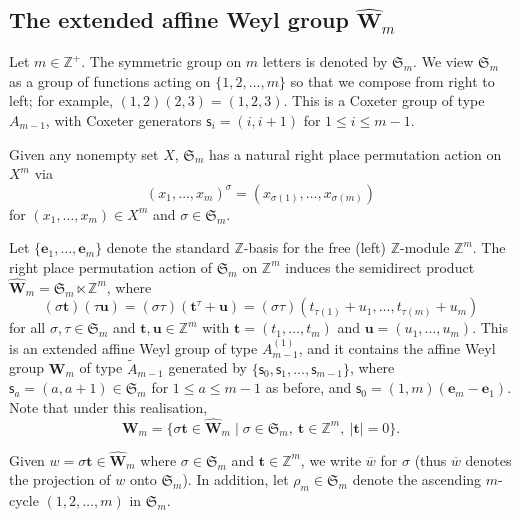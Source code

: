 \documentclass[11pt,a4paper,reqno]{amsart}
\numberwithin{equation}{section}
\theoremstyle{plain}
\theoremstyle{definition}
\theoremstyle{remark}
\numberwithin{equation}{section}
\newcommand{\bt}{\mathbf{t}}
\newcommand{\bu}{\mathbf{u}}
\newcommand{\ZZ}{\mathbb{Z}}
\newcommand{\cs}{\mathsf{s}}
\newcommand{\rr}{\rho}
\newcommand{\Be}{\mathbf{e}}
\newcommand{\EW}{\widehat{\mathbf{W}}}
\newcommand{\AW}{\mathbf{W}}
\newcommand{\sym}[1]{\mathfrak{S}_{#1}}
\def\Z{{\mathbb Z}}
\begin{document}
\subsection{The extended affine Weyl group $\EW_{m}$} \label{SS:Weyl}

Let $m \in \Z^+$.
The symmetric group on $m$ letters is denoted by $\sym{m}$.  We view $\sym{m}$ as a group of functions acting on $\{1,2,\dotsc,m\}$ so that we compose from right to left; for example, $(1,2)(2,3) = (1,2,3)$.  This is a Coxeter group of type $A_{m-1}$, with Coxeter generators $\cs_i = (i,i+1)$ for $1 \leq i \leq m-1$.

Given any nonempty set $X$, $\sym{m}$ has a natural right place permutation action on $X^{m}$ via
$$
(x_1,\dotsc, x_{m})^{\sigma} = (x_{\sigma(1)},\dotsc, x_{\sigma(m)})
$$
for $(x_1,\dotsc, x_m) \in X^m$ and $\sigma \in \sym{m}$.

Let $\{ \Be_1, \dotsc, \Be_m\}$ denote the standard $\Z$-basis for the free (left) $\Z$-module $\Z^m$.
The right place permutation action of $\sym{m}$ on $\Z^m$ induces the semidirect product $\EW_m = \sym{m} \ltimes \Z^m$,
where
\begin{equation*}
(\sigma \bt)(\tau \bu) = (\sigma\tau) (\bt^{\tau} + \bu) = (\sigma\tau) (t_{\tau(1)} + u_1, \dotsc, t_{\tau(m)}+ u_m) %
\end{equation*}
for all $\sigma,\tau \in \sym{m}$ and $\bt,\bu \in \Z^m$ with $\bt = (t_1,\dotsc, t_m)$ and $\bu = (u_1,\dotsc, u_m)$.
This is an extended affine Weyl group of type $A^{(1)}_{m-1}$, and it contains the affine Weyl group $\AW_m$ of type $\widetilde{A}_{m-1}$ generated by $\{ \cs_0,\cs_1, \dotsc, \cs_{m-1}\}$, where $\cs_a = (a,a+1) \in \sym{m}$ for $1 \leq a \leq m-1$ as before, and $\cs_0 = (1,m)(\Be_m - \Be_1)$.
Note that under this realisation,
\begin{equation}
\AW_m = \{ \sigma \bt \in \EW_m \mid \sigma \in \sym{m},\ \bt \in \ZZ^m,\ |\bt| = 0 \}. \label{E:affineWeylgroup}
\end{equation}


Given $w = \sigma \bt \in \EW_m$ where $\sigma \in \sym{m}$ and $\bt \in \ZZ^{m}$, we write $\overline {w}$ for $\sigma$ (thus $\overline{w}$ denotes the projection of $w$ onto $\sym{m}$).
In addition, let $\rr_m \in \sym{m}$ denote the ascending $m$-cycle $(1,2,\dotsc, m)$ in $\sym{m}$.
\end{document}
